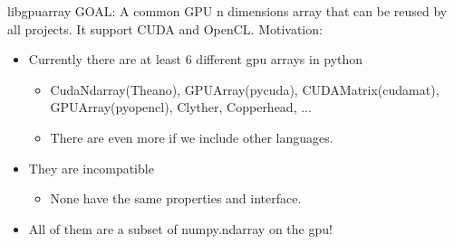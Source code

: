 \documentclass[utf8x,xcolor=pdftex,dvipsnames,table]{beamer}
\begin{document}
\begin{frame}{libgpuarray}
  GOAL: A common GPU n dimensions array that can be reused by all projects. It support CUDA and OpenCL.
  \newline \newline
  Motivation:
  \begin{itemize}
  \item Currently there are at least 6 different gpu arrays in python
    \begin{itemize}
    \item CudaNdarray(Theano), GPUArray(pycuda), CUDAMatrix(cudamat), GPUArray(pyopencl), Clyther, Copperhead, ...
    \item There are even more if we include other languages.
    \end{itemize}
  \item They are incompatible
    \begin{itemize}
    \item None have the same properties and interface.
    \end{itemize}
  \item All of them are a subset of numpy.ndarray on the gpu!
  \end{itemize}
\end{frame}
\end{document}
